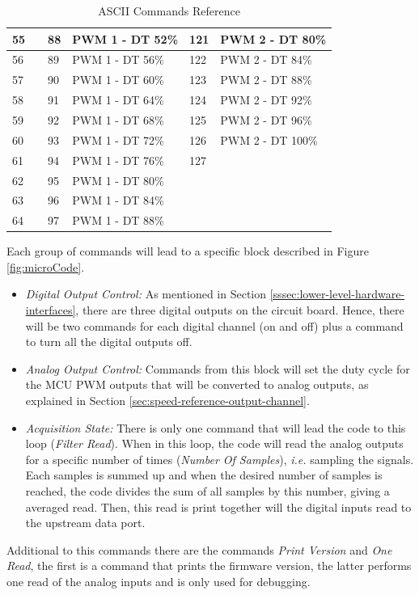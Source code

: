 \begin{table}[h!]
\begin{tabular}{|l|l|l|l|l|l|}
		55 &  & 88 & PWM 1 - DT 52\% & 121 & PWM 2 - DT 80\% \\ \hline
		56 &  & 89 & PWM 1 - DT 56\% & 122 & PWM 2 - DT 84\% \\ \hline
		57 &  & 90 & PWM 1 - DT 60\% & 123 & PWM 2 - DT 88\% \\ \hline
		58 &  & 91 & PWM 1 - DT 64\% & 124 & PWM 2 - DT 92\% \\ \hline
		59 &  & 92 & PWM 1 - DT 68\% & 125 & PWM 2 - DT 96\% \\ \hline
		60 &  & 93 & PWM 1 - DT 72\% & 126 & PWM 2 - DT 100\% \\ \hline
		61 &  & 94 & PWM 1 - DT 76\% & 127 &  \\ \hline
		62 &  & 95 & PWM 1 - DT 80\% &  &  \\ \hline
		63 &  & 96 & PWM 1 - DT 84\% &  &  \\ \hline
		64 &  & 97 & PWM 1 - DT 88\% &  &  \\ \hline
		\end{tabular}
		\caption{ASCII Commands Reference}
		\label{table:ascii-commands}
	\end{table}


	Each group of commands will lead to a specific block described in Figure \ref{fig:microCode}.

	\begin{itemize}
		\item \textit{Digital Output Control:} As mentioned in Section \ref{sssec:lower-level-hardware-interfaces}, there are three digital outputs on the circuit board. Hence, there will be two commands for each digital channel (on and off) plus a command to turn all the digital outputs off. 
		\item \textit{Analog Output Control:} Commands from this block will set the duty cycle for the MCU PWM outputs that will be converted to analog outputs, as explained in Section \ref{sec:speed-reference-output-channel}.
		\item \textit{Acquisition State: } There is only one command that will lead the code to this loop (\textit{Filter Read}). When in this loop, the code will read the analog outputs for a specific number of times (\textit{Number Of Samples}), \textit{i.e.} sampling the signals. Each samples is summed up and when the desired number of samples is reached, the code divides the sum of all samples by this number, giving a averaged read. Then, this read is print together will the digital inputs read to the upstream data port.
	\end{itemize}

	Additional to this commands there are the commands \textit{Print Version} and \textit{One Read}, the first is a command that prints the firmware version, the latter performs one read of the analog inputs and is only used for debugging.